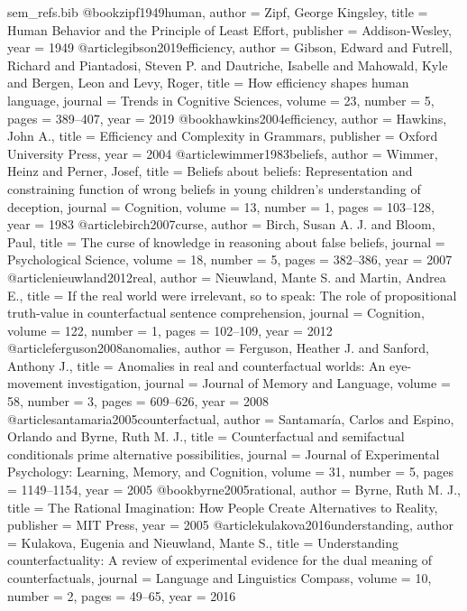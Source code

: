 \begin{filecontents}[overwrite]{sem_refs.bib}
@book{zipf1949human,
  author = {Zipf, George Kingsley},
  title = {Human Behavior and the Principle of Least Effort},
  publisher = {Addison-Wesley}, year = {1949}}
@article{gibson2019efficiency,
  author = {Gibson, Edward and Futrell, Richard and Piantadosi, Steven P. and Dautriche, Isabelle and Mahowald, Kyle and Bergen, Leon and Levy, Roger},
  title = {How efficiency shapes human language},
  journal = {Trends in Cognitive Sciences}, volume = {23}, number = {5}, pages = {389--407}, year = {2019}}
@book{hawkins2004efficiency,
  author = {Hawkins, John A.},
  title = {Efficiency and Complexity in Grammars},
  publisher = {Oxford University Press}, year = {2004}}
@article{wimmer1983beliefs,
  author = {Wimmer, Heinz and Perner, Josef},
  title = {Beliefs about beliefs: Representation and constraining function of wrong beliefs in young children's understanding of deception},
  journal = {Cognition}, volume = {13}, number = {1}, pages = {103--128}, year = {1983}}
@article{birch2007curse,
  author = {Birch, Susan A. J. and Bloom, Paul},
  title = {The curse of knowledge in reasoning about false beliefs},
  journal = {Psychological Science}, volume = {18}, number = {5}, pages = {382--386}, year = {2007}}
@article{nieuwland2012real,
  author = {Nieuwland, Mante S. and Martin, Andrea E.},
  title = {If the real world were irrelevant, so to speak: The role of propositional truth-value in counterfactual sentence comprehension},
  journal = {Cognition}, volume = {122}, number = {1}, pages = {102--109}, year = {2012}}
@article{ferguson2008anomalies,
  author = {Ferguson, Heather J. and Sanford, Anthony J.},
  title = {Anomalies in real and counterfactual worlds: An eye-movement investigation},
  journal = {Journal of Memory and Language}, volume = {58}, number = {3}, pages = {609--626}, year = {2008}}
@article{santamaria2005counterfactual,
  author = {Santamar{\'i}a, Carlos and Espino, Orlando and Byrne, Ruth M. J.},
  title = {Counterfactual and semifactual conditionals prime alternative possibilities},
  journal = {Journal of Experimental Psychology: Learning, Memory, and Cognition}, volume = {31}, number = {5}, pages = {1149--1154}, year = {2005}}
@book{byrne2005rational,
  author = {Byrne, Ruth M. J.},
  title = {The Rational Imagination: How People Create Alternatives to Reality},
  publisher = {MIT Press}, year = {2005}}
@article{kulakova2016understanding,
  author = {Kulakova, Eugenia and Nieuwland, Mante S.},
  title = {Understanding counterfactuality: A review of experimental evidence for the dual meaning of counterfactuals},
  journal = {Language and Linguistics Compass}, volume = {10}, number = {2}, pages = {49--65}, year = {2016}}

\end{filecontents}
